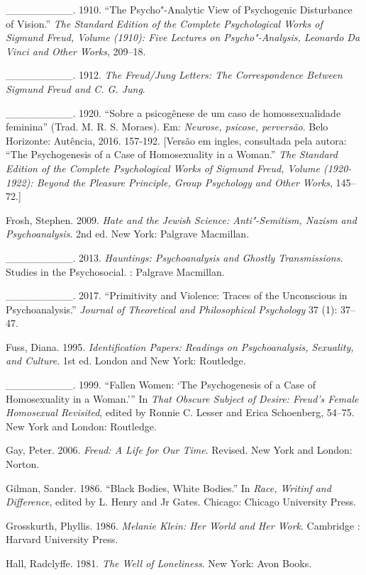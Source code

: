 \_\_\_\_\_\_\_\_\_. 1910. ``The Psycho"-Analytic View of Psychogenic Disturbance
of Vision.'' \emph{The Standard Edition of the Complete Psychological
Works of Sigmund Freud, Volume  (1910): Five Lectures on
Psycho"-Analysis, Leonardo Da Vinci and Other Works}, 209--18.

\_\_\_\_\_\_\_\_\_. 1912. \emph{The Freud/Jung Letters: The Correspondence
Between Sigmund Freud and C. G. Jung}.

\_\_\_\_\_\_\_\_\_. 1920. ``Sobre a psicogênese de um caso de homossexualidade
feminina'' (Trad. M. R. S. Moraes). Em: \emph{Neurose, psicose,
perversão}. Belo Horizonte: Autência, 2016. 157-192. {[}Versão em
ingles, consultada pela autora: ``The Psychogenesis of a Case of
Homosexuality in a Woman.'' \emph{The Standard Edition of the Complete
Psychological Works of Sigmund Freud, Volume  (1920-1922): Beyond
the Pleasure Principle, Group Psychology and Other Works}, 145--72.{]}

Frosh, Stephen. 2009. \emph{Hate and the Jewish Science: Anti"-Semitism,
Nazism and Psychoanalysis}. 2nd ed. New York: Palgrave Macmillan.

\_\_\_\_\_\_\_\_\_. 2013. \emph{Hauntings: Psychoanalysis and Ghostly
Transmissions}. Studies in the Psychosocial. : Palgrave Macmillan.

\_\_\_\_\_\_\_\_\_. 2017. ``Primitivity and Violence: Traces of the Unconscious
in Psychoanalysis.'' \emph{Journal of Theoretical and Philosophical
Psychology} 37 (1): 37--47.

Fuss, Diana. 1995. \emph{Identification Papers: Readings on
Psychoanalysis, Sexuality, and Culture}. 1st ed. London and New York:
Routledge.

\_\_\_\_\_\_\_\_\_. 1999. ``Fallen Women: `The Psychogenesis of a Case of
Homosexuality in a Woman.''' In \emph{That Obscure Subject of Desire:
Freud's Female Homosexual Revisited}, edited by Ronnie C. Lesser and
Erica Schoenberg, 54--75. New York and London: Routledge.

Gay, Peter. 2006. \emph{Freud: A Life for Our Time}. Revised. New York
and London: Norton.

Gilman, Sander. 1986. ``Black Bodies, White Bodies.'' In \emph{Race,
Writinf and Difference}, edited by L. Henry and Jr Gates. Chicago:
Chicago University Press.

Grosskurth, Phyllis. 1986. \emph{Melanie Klein: Her World and Her Work}.
Cambridge : Harvard University Press.

Hall, Radclyffe. 1981. \emph{The Well of Loneliness}. New York: Avon
Books.

